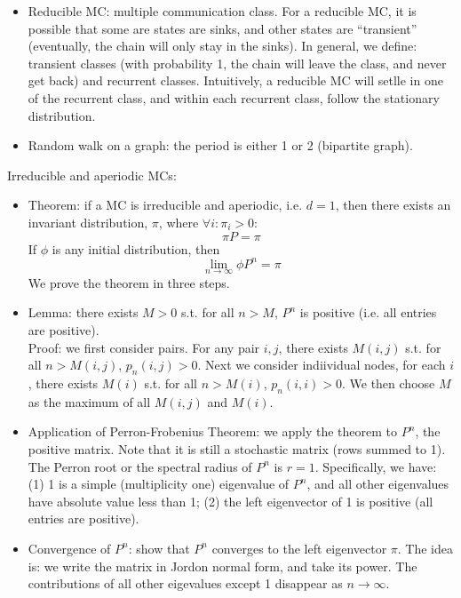 \documentclass{report}
\begin{document}
\begin{enumerate}
\begin{itemize}
\item Reducible MC: multiple communication class. For a reducible MC, it is possible that some are states are sinks, and other states are ``transient'' (eventually, the chain will only stay in the sinks). In general, we define: transient classes (with probability 1, the chain will leave the class, and never get back) and recurrent classes. Intuitively, a reducible MC will setlle in one of the recurrent class, and within each recurrent class, follow the stationary distribution. 

\item Random walk on a graph: the period is either 1 or 2 (bipartite graph). 
\end{itemize}

Irreducible and aperiodic MCs:
\begin{itemize}
\item Theorem: if a MC is irreducible and aperiodic, i.e. $d = 1$, then there exists an invariant distribution, $\pi$, where $\forall i: \pi_i > 0$: 
\begin{equation}
\pi P = \pi	
\end{equation}
If $\phi$ is any initial distribution, then 
\begin{equation}
\lim_{n \to \infty} \phi P^n = \pi 	
\end{equation}
We prove the theorem in three steps. 

\item Lemma: there exists $M > 0$ s.t. for all $n > M$, $P^n$ is positive (i.e. all entries are positive). \\
Proof: we first consider pairs. For any pair $i,j$, there exists $M(i,j)$ s.t. for all $n > M(i,j)$, $p_n(i,j) > 0$. Next we consider indiividual nodes, for each $i$, there exists $M(i)$ s.t. for all $n > M(i)$, $p_n(i,i) > 0$. We then choose $M$ as the maximum of all $M(i,j)$ and $M(i)$. 

\item Application of Perron-Frobenius Theorem: we apply the theorem to $P^n$, the positive matrix. Note that it is still a stochastic matrix (rows summed to 1). The Perron root or the spectral radius of $P^n$ is $r = 1$. Specifically, we have: (1) 1 is a simple (multiplicity one) eigenvalue of $P^n$, and all other eigenvalues have absolute value less than 1; (2) the left eigenvector of 1 is positive (all entries are positive). 

\item Convergence of $P^n$: show that $P^n$ converges to the left eigenvector $\pi$. The idea is: we write the matrix in Jordon normal form, and take its power. The contributions of all other eigevalues except 1 disappear as $n \to \infty$. 


\end{itemize}
\end{enumerate}
\end{document}
